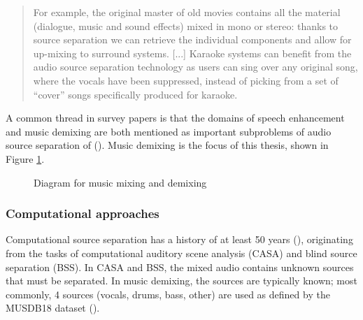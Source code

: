 \documentclass[report.tex]{subfiles}
\begin{document}
\begin{quote}
	For example, the original master of old movies contains all the material (dialogue, music and sound effects) mixed in mono or stereo: thanks to source separation we can retrieve the individual components and allow for up-mixing to surround systems. [...] Karaoke systems can benefit from the audio source separation technology as users can sing over any original song, where the vocals have been suppressed, instead of picking from a set of ``cover'' songs specifically produced for karaoke.
\end{quote}

A common thread in survey papers is that the domains of speech enhancement and music demixing are both mentioned as important subproblems of audio source separation of (\cite{musicsepintro1, musicmask}). Music demixing is the focus of this thesis, shown in Figure \ref{fig:mixingdiagrams}.

\begin{figure}[ht]
	\centering
	\caption{Diagram for music mixing and demixing\protect\footnotemark[\value{footnote}]}
	\label{fig:mixingdiagrams}
\end{figure}


\newpagefill

\subsubsection{Computational approaches}

Computational source separation has a history of at least 50 years (\cite{musicmask, musicsepintro1}), originating from the tasks of computational auditory scene analysis (CASA) and blind source separation (BSS). In CASA and BSS, the mixed audio contains unknown sources that must be separated. In music demixing, the sources are typically known; most commonly, 4 sources (vocals, drums, bass, other) are used as defined by the MUSDB18 dataset (\cite{musdb18}).
\end{document}
